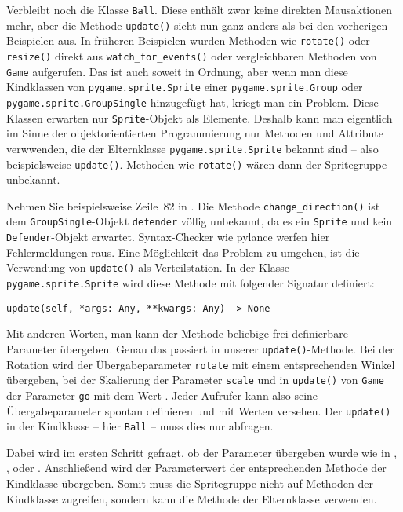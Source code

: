 
Verbleibt noch die Klasse \texttt{Ball}. Diese enthält zwar keine direkten Mausaktionen mehr, aber die Methode \texttt{update()} sieht nun ganz anders als bei den vorherigen Beispielen aus. In früheren Beispielen wurden Methoden wie \texttt{rotate()} oder \texttt{resize()} direkt aus \texttt{watch\_for\_events()} oder vergleichbaren Methoden von \texttt{Game} aufgerufen. Das ist auch soweit in Ordnung, aber wenn man diese Kindklassen von \texttt{pygame.sprite.Sprite} einer \texttt{pygame.sprite.Group} oder \texttt{pygame.sprite.GroupSingle} hinzugefügt hat, kriegt man ein Problem. Diese Klassen erwarten nur \texttt{Sprite}-Objekt als Elemente. Deshalb kann man eigentlich im Sinne der objektorientierten Programmierung nur Methoden und Attribute verwwenden, die der Elternklasse \texttt{pygame.sprite.Sprite} bekannt sind -- also beispielsweise \texttt{update()}. Methoden wie \texttt{rotate()} wären dann der Spritegruppe unbekannt.

Nehmen Sie beispielsweise Zeile~82 in . Die Methode \texttt{change\_\-direction()} ist dem \texttt{GroupSingle}-Objekt \texttt{defender} völlig unbekannt, da es ein \texttt{Sprite} und kein \texttt{Defender}-Objekt erwartet. Syntax-Checker wie \gls{pylance} werfen hier Fehlermeldungen raus. Eine Möglichkeit das Problem zu umgehen, ist die Verwendung von \texttt{update()} als Verteilstation. In der Klasse \texttt{pygame.sprite.Sprite} wird diese Methode mit folgender Signatur definiert: 

\verb+update(self, *args: Any, **kwargs: Any) -> None+

Mit anderen Worten, man kann der Methode beliebige frei definierbare Parameter übergeben. Genau das passiert in unserer \texttt{update()}-Methode. Bei der Rotation wird der Übergabeparameter \texttt{rotate} mit einem entsprechenden Winkel übergeben, bei der Skalierung der Parameter \texttt{scale} und in \texttt{update()} von \texttt{Game} der Parameter \texttt{go} mit dem Wert \true. Jeder Aufrufer kann also seine Übergabeparameter spontan definieren und mit Werten versehen. Der \texttt{update()} in der Kindklasse -- hier \texttt{Ball} -- muss dies nur abfragen. 

Dabei wird im ersten Schritt gefragt, ob der Parameter übergeben wurde wie in , ,  oder . Anschließend wird der Parameterwert der entsprechenden Methode der Kindklasse übergeben. Somit muss die Spritegruppe nicht auf Methoden der Kindklasse zugreifen, sondern kann die Methode der Elternklasse verwenden.


